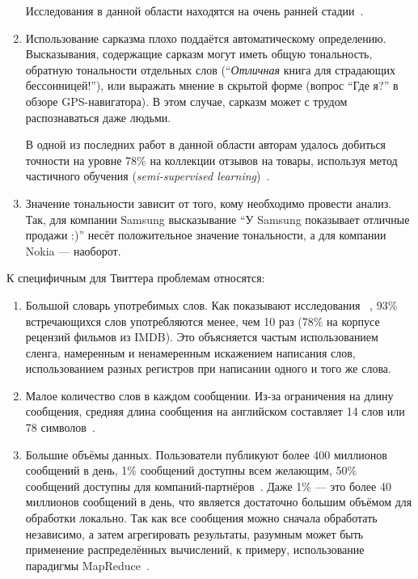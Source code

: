 \begin{enumerate}
Исследования в данной области находятся на очень ранней стадии~\cite{negation}.

\item 
Использование сарказма плохо поддаётся автоматическому определению. 
Высказывания, содержащие сарказм могут иметь общую тональность, 
обратную тональности отдельных слов 
(``\textit{Отличная} книга для страдающих бессонницей!''), 
или выражать мнение в скрытой форме (вопрос ``Где я?'' 
в обзоре GPS-навигатора). В этом случае, сарказм может с трудом распознаваться даже людьми. 

В одной из последних работ в данной области авторам удалось 
добиться точности на уровне 78\% на коллекции отзывов на товары, используя 
метод частичного обучения (\textit{semi-supervised learning})~\cite{sarcasm}.

\item 
Значение тональности зависит от того, кому необходимо провести анализ. 
Так, для компании Samsung высказывание ``У Samsung показывает отличные продажи :)'' несёт положительное значение тональности, а для компании Nokia --- наоборот.

\end{enumerate}

\vspace{0.5cm}

К специфичным для Твиттера проблемам относятся:

\begin{enumerate}

\item 
Большой словарь употребимых слов.  
Как показывают исследования~\cite{sparsity}	, 93\% встречающихся слов 
употребляются менее, чем 10 раз (78\% на корпусе рецензий фильмов из IMDB). 
Это объясняется частым использованием сленга, намеренным и ненамеренным искажением написания слов, использованием разных регистров при написании одного и того же слова.

\item 
Малое количество слов в каждом сообщении. 
Из-за ограничения на длину сообщения, средняя длина сообщения на 
английском составляет 14 слов или 78 символов~\cite{distsuperv}.

\item 
Большие объёмы данных. 
Пользователи публикуют более 400 миллионов сообщений в день, 
1\% сообщений доступны всем желающим, 
50\% сообщений доступны для компаний-партнёров~\cite{streaming}. 
Даже 1\% --- это более 40 миллионов сообщений в день, что является 
достаточно большим объёмом для обработки локально. 
Так как все сообщения можно сначала обработать независимо, 
а затем агрегировать результаты, 	разумным 
может быть применение распределённых вычислений, к примеру, 
использование парадигмы MapReduce~\cite{largescaleml, sentiment_mapreduce}.

\end{enumerate}